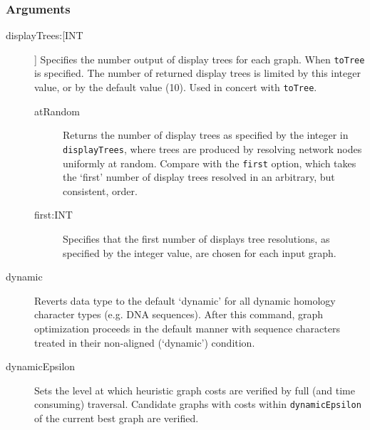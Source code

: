	\subsubsection{Arguments}
	\begin{description}
			
			
		\item[displayTrees:[INT]] Specifies the number output of display trees for each graph. 
		When \texttt{toTree} is specified. The number of returned display trees is limited by this
		integer value, or by the default value (10). Used in concert with \texttt{toTree}.
		
		\begin{description}
			
			\item[atRandom] Returns the number of display trees as specified by the integer in 
			 \texttt{displayTrees}, where trees are produced by 
			resolving network nodes uniformly at random. Compare with the \texttt{first} option, 
			which takes the `first' number of display trees resolved in an arbitrary, but consistent, 
			order.

			\item[first:INT] Specifies that the first number of displays tree resolutions, as 
			specified by the integer value, are chosen for each input graph. 
			
		\end{description}
			
		\item[dynamic] Reverts data type to the default `dynamic' for all dynamic homology 
		\citep{Wheeler2001} character types (e.g. DNA sequences). After this command, 
		graph optimization proceeds in the default manner with sequence characters treated 
		in their non-aligned (`dynamic') condition.
			
		\item[dynamicEpsilon] Sets the level at which heuristic graph costs are verified by full 
		(and time consuming) traversal. Candidate graphs with costs within \texttt{dynamicEpsilon}
		 of the current best graph are verified.
			

\end{description}

